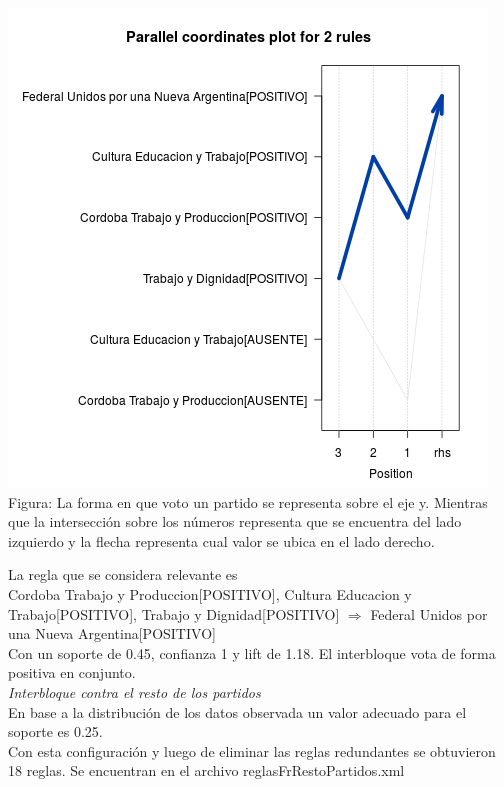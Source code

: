 \documentclass{endm}
\begin{document}
\begin{center}
\includegraphics[scale=0.5]{graficos/paracoordFr.png} \\
\scriptsize{Figura: La forma en que voto un partido se representa sobre el eje y. Mientras que la intersección sobre  los números representa que se encuentra del lado izquierdo y la flecha representa cual valor se ubica en el lado derecho.} \\
\end{center} 

La regla que se considera relevante es \\

{Cordoba Trabajo y Produccion[POSITIVO], Cultura Educacion y Trabajo[POSITIVO], Trabajo y Dignidad[POSITIVO]} $\Longrightarrow$ {Federal Unidos por una Nueva Argentina[POSITIVO]} \\

Con un soporte de 0.45, confianza 1 y lift de 1.18. El interbloque vota de forma positiva en conjunto. \\

\textit{Interbloque contra el resto de los partidos} \\

En base a la distribución de los datos observada un valor adecuado para el soporte es 0.25. \\

Con esta configuración y luego de eliminar las reglas redundantes se obtuvieron 18 reglas. Se encuentran en el archivo reglasFrRestoPartidos.xml  \\
\end{document}
